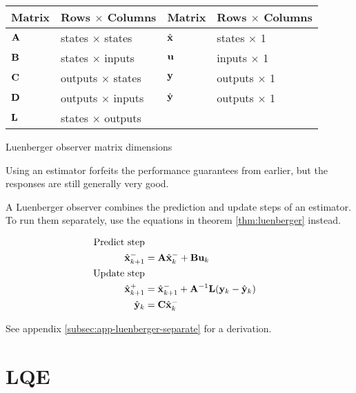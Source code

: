 \begin{booktable}
  \begin{tabular}{|ll|ll|}
    \hline
    \rowcolor{headingbg}
    \textbf{Matrix} & \textbf{Rows $\times$ Columns} &
    \textbf{Matrix} & \textbf{Rows $\times$ Columns} \\
    \hline
    $\mathbf{A}$ & states $\times$ states & $\hat{\mathbf{x}}$ & states $\times$ 1 \\
    $\mathbf{B}$ & states $\times$ inputs & $\mathbf{u}$ & inputs $\times$ 1 \\
    $\mathbf{C}$ & outputs $\times$ states & $\mathbf{y}$ & outputs $\times$ 1 \\
    $\mathbf{D}$ & outputs $\times$ inputs & $\hat{\mathbf{y}}$ & outputs $\times$ 1 \\
    $\mathbf{L}$ & states $\times$ outputs &  &  \\
    \hline
  \end{tabular}
  \caption{Luenberger observer matrix dimensions}
  \label{tab:luenberger_matrix_dims}
\end{booktable}

Using an estimator forfeits the performance guarantees from earlier, but the
responses are still generally very good.

A Luenberger observer combines the prediction and update steps of an estimator.
To run them separately, use the equations in theorem \ref{thm:luenberger}
instead.

\begin{theorem}
  \begin{align}
    \text{Predict step} \nonumber \\
    \hat{\mathbf{x}}_{k+1}^- &= \mathbf{A}\hat{\mathbf{x}}_k^- + \mathbf{B}\mathbf{u}_k \\
    \text{Update step} \nonumber \\
    \hat{\mathbf{x}}_{k+1}^+ &= \hat{\mathbf{x}}_{k+1}^- + \mathbf{A}^{-1}\mathbf{L}
      (\mathbf{y}_k - \hat{\mathbf{y}}_k) \\
    \hat{\mathbf{y}}_k &= \mathbf{C} \hat{\mathbf{x}}_k^-
  \end{align}
  \label{thm:luenberger}
\end{theorem}

See appendix \ref{subsec:app-luenberger-separate} for a derivation.

\section{LQE}


